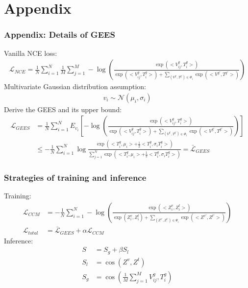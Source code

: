 \documentclass[notes, 10pt, aspectratio=169]{beamer}
\begin{document}
\section*{Appendix}
\begin{frame}
    \frametitle{Appendix: Details of GEES}
    Vanilla NCE loss:
    \begin{align*}
        \mathcal{L}_{NCE} = \frac{1}{N}\sum_{i = 1}^N \frac{1}{M}\sum_{j = 1}^M -\log \left( \frac{\exp \left( <V_{ij}^g, T_i^g> \right) }{\exp\left( <V_{ij}^g, T_i^g> \right) + \sum_{(V^{g'}, T^{g'})\in \Phi_i}\exp\left( <V^{g'}, T^{g'}> \right) } \right) 
    \end{align*}
    Multivariate Gaussian distribution assumption:
    \begin{align*}
        v_i\sim \mathcal{N}\left( \mu_i, \sigma_i \right) 
    \end{align*}
    Derive the GEES and its upper bound:
    \begin{align*}
        \mathcal{L}_{GEES} &= \frac{1}{N}\sum_{i = 1}^N E_{v_i} \left[ -\log \left(  \frac{\exp \left( <V_{ij}^g, T_i^g> \right) }{\exp\left( <V_{ij}^g, T_i^g> \right) + \sum_{(V^{g'}, T^{g'})\in \Phi_i}\exp\left( <V^{g'}, T^{g'}> \right) }  \right)  \right] \\
                           &\leq -\frac{1}{N}\sum_{i = 1}^N\log \frac{\exp\left( <T_i^g, \mu_i> + \frac{1}{2}<T_i^g, \sigma_iT_i^g> \right) }{\sum_{j=1}^N\exp\left( <T_i^g, \mu_i> + \frac{1}{2}<T_i^g, \sigma_iT_i^g> \right) } = \bar{\mathcal{L}}_{GEES}
    \end{align*}
\end{frame}

\begin{frame}
    \frametitle{Strategies of training and inference}
    Training:
    \begin{align*}
    \mathcal{L}_{CCM}&= -\frac{1}{N}\sum_{i = 1}^N-\log \left( \frac{\exp\left( <Z_i^v, Z_i^t> \right) }{\exp\left( Z_i^v, Z_i^t \right)+\sum_{(Z^{v'}, Z^{t'})\in \Psi_i}\exp\left( <Z^{v'}, Z^{t'}> \right)  } \right) \\
    \mathcal{L}_{total} &= \bar{\mathcal{L}}_{GEES} + \alpha \mathcal{L}_{CCM}
    \end{align*}
    Inference:
    \begin{align*}
        S &= S_g + \beta S_l\\
        S_l &= \cos\left( Z^v, Z^t \right) \\
        S_g &= \cos\left( \frac{1}{M}\sum_{j = 1}^M V_{ij}^g, T_i^g \right) 
    \end{align*}
\end{frame}
\end{document}
